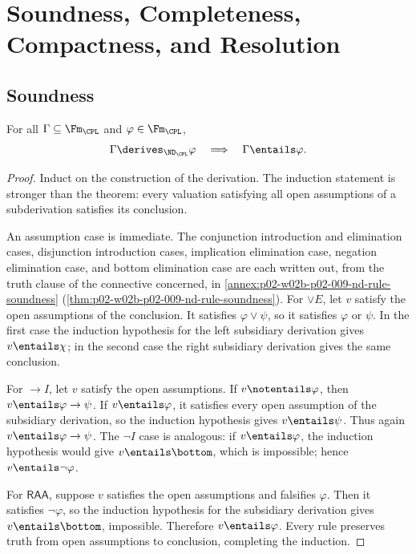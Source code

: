 \chapter{Soundness, Completeness, Compactness, and Resolution}
\label{ch:prop-metatheory}

\section{Soundness}
\label{sec:prop-metatheory-01}

\begin{theorem}
\label{thm:prop-nd-soundness}
For all \(\Gamma\subseteq\Fm_{\CPL}\) and
\(\varphi\in\Fm_{\CPL}\),
\[
 \Gamma\derives_{\ND_{\CPL}}\varphi
 \quad\Longrightarrow\quad
 \Gamma\entails\varphi.
\]
\end{theorem}
\begin{proof}
Induct on the construction of the derivation.  The induction statement is
stronger than the theorem: every valuation satisfying all open assumptions of
a subderivation satisfies its conclusion.

An assumption case is immediate.  The conjunction introduction and
elimination cases, disjunction introduction cases, implication elimination
case, negation elimination case, and bottom elimination case are each written
out, from the truth clause of the connective concerned, in
\cref{annex:p02-w02b-p02-009-nd-rule-soundness}
(\cref{thm:p02-w02b-p02-009-nd-rule-soundness}).  For \(\lor E\), let \(v\) satisfy the
open assumptions of the conclusion.  It satisfies \(\varphi\lor\psi\), so it
satisfies \(\varphi\) or \(\psi\).  In the first case the induction hypothesis
for the left subsidiary derivation gives \(v\entails\chi\); in the second case
the right subsidiary derivation gives the same conclusion.

For \(\to I\), let \(v\) satisfy the open assumptions.  If
\(v\notentails\varphi\), then \(v\entails\varphi\to\psi\).  If
\(v\entails\varphi\), it satisfies every open assumption of the subsidiary
derivation, so the induction hypothesis gives \(v\entails\psi\).  Thus again
\(v\entails\varphi\to\psi\).  The \(\neg I\) case is analogous: if
\(v\entails\varphi\), the induction hypothesis would give
\(v\entails\bottom\), which is impossible; hence
\(v\entails\neg\varphi\).

For \(\mathsf{RAA}\), suppose \(v\) satisfies the open assumptions
and falsifies \(\varphi\).  Then it satisfies \(\neg\varphi\), so the
induction hypothesis for the subsidiary derivation gives
\(v\entails\bottom\), impossible.  Therefore \(v\entails\varphi\).  Every
rule preserves truth from open assumptions to conclusion, completing the
induction.
\end{proof}


